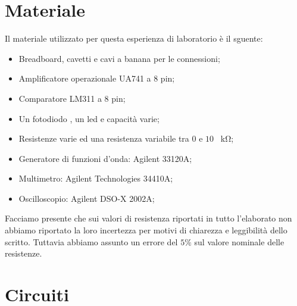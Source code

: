 \section*{Materiale}

Il materiale utilizzato per questa esperienza di laboratorio è il sguente:

\begin{itemize} \itemsep2pt \parskip0pt 
    \item{Breadboard, cavetti e cavi a banana per le connessioni;}
    \item{Amplificatore operazionale UA741 a 8 pin;}
    \item{Comparatore LM311 a 8 pin;}
    \item{Un fotodiodo , un led e capacità varie;}
    \item{Resistenze varie ed una resistenza variabile tra $0$ e $10$ \SI{}{\kilo\ohm};}
    \item{Generatore di funzioni d'onda: Agilent 33120A;}
    \item{Multimetro: Agilent Technologies 34410A;}
    \item{Oscilloscopio: Agilent DSO-X 2002A;}
\end{itemize}

Facciamo presente che sui valori di resistenza riportati in tutto l'elaborato non abbiamo riportato la loro incertezza per motivi di chiarezza e leggibilità dello scritto. Tuttavia abbiamo assunto un errore del $5\%$ sul valore nominale delle resistenze.

\section*{Circuiti}

